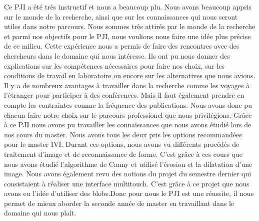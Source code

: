 Ce PJI a été très instructif et nous a beaucoup plu. Nous avons beaucoup appris sur le monde 
de la recherche, ainsi que sur les connaissances qui nous seront utiles dans notre parcours.
Nous sommes très attirés par le monde de la recherche et parmi nos objectifs pour le PJI, nous voulions 
nous faire une idée plus précise de ce milieu. Cette expérience nous a permis de faire des rencontres
avec des chercheurs dans le domaine qui nous intéresse. Ils ont pu nous donner des explications
sur les compétences nécessaires pour faire nos choix, sur les conditions de travail en laboratoire 
ou encore sur les alternatives que nous avions. Il y a de nombreux avantages à travailler dans la recherche
comme les voyages à l'étranger pour participer à des conférences. Mais il faut également prendre en compte les contraintes
comme la fréquence des publications. Nous avons donc pu chacun faire notre choix sur le parcours professionel
que nous privilégions.
Grâce à ce PJI nous avons pu travailler les connaissances que nous avons étudié lors de nos cours du master.
Nous avons tous les deux pris les options recommandées pour le master IVI. Durant ces options, nous avons 
vu différents procédés de traitement d'image et de reconnaissance de forme. C'est grâce à ces cours que nous
avons étudié l'algorithme de Canny et utilisé l'érosion et la dilatation d'une image. Nous avons également
revu des notions du projet du semestre dernier qui consistaient à réaliser une interface multitouch. C'est grâce
à ce projet que nous avons eu l'idée d'utiliser des blobs.Donc pour nous le PJI est une réussite, il nous permet de 
mieux aborder la seconde année de master en travaillant dans le domaine qui nous plaît.
\newpage